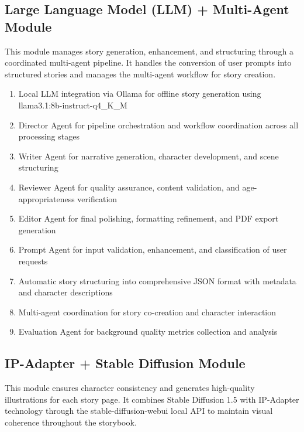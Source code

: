 \subsection{Large Language Model (LLM) + Multi-Agent Module}

This module manages story generation, enhancement, and structuring through a coordinated multi-agent pipeline. It handles the conversion of user prompts into structured stories and manages the multi-agent workflow for story creation.

\begin{enumerate}
    \item Local LLM integration via Ollama for offline story generation using llama3.1:8b-instruct-q4\_K\_M
    \item Director Agent for pipeline orchestration and workflow coordination across all processing stages
    \item Writer Agent for narrative generation, character development, and scene structuring
    \item Reviewer Agent for quality assurance, content validation, and age-appropriateness verification
    \item Editor Agent for final polishing, formatting refinement, and PDF export generation
    \item Prompt Agent for input validation, enhancement, and classification of user requests
    \item Automatic story structuring into comprehensive JSON format with metadata and character descriptions
    \item Multi-agent coordination for story co-creation and character interaction
    \item Evaluation Agent for background quality metrics collection and analysis
\end{enumerate}

\subsection{IP-Adapter + Stable Diffusion Module}

This module ensures character consistency and generates high-quality illustrations for each story page. It combines Stable Diffusion 1.5 with IP-Adapter technology through the stable-diffusion-webui local API to maintain visual coherence throughout the storybook.

